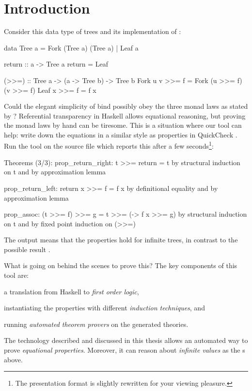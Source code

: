 
\chapter{Introduction}


Consider this data type of trees \citep{grafting} and its implementation
of  \citep{mtl}:

\begin{code}
data Tree a = Fork (Tree a) (Tree a) | Leaf a

return :: a -> Tree a
return = Leaf

(>>=) :: Tree a -> (a -> Tree b) -> Tree b
Fork u v >>= f = Fork (u >>= f) (v >>= f)
Leaf x   >>= f = f x
\end{code}

\noindent
Could the elegant simplicity of bind possibly obey the three monad
laws as stated by \cite{essenceoffp}? Referential transparency in
Haskell allows equational reasoning, but proving the monad laws by
hand can be tiresome. This is a situation where our tool can help:
write down the equations in a similar style as properties in
QuickCheck \citep{quickcheck}. Run the tool on the source file which
reports this after a few seconds\footnote{The presentation format is
  slightly rewritten for your viewing pleasure.}:


\begin{code}
Theorems (3/3):
  prop_return_right: t >>= return = t
    by structural induction on t and by approximation lemma

  prop_return_left: return x >>= f = f x
    by definitional equality and by approximation lemma

  prop_assoc: (t >>= f) >>= g = t >>= (\x -> f x >>= g)
    by structural induction on t and by fixed point induction on (>>=)
\end{code}

\noindent
The output  means that the properties hold for infinite
trees, in contrast to the possible result .

What is going on behind the scenes to prove this? The key components
of this tool are:

\begin{enumerate}
{\setlength\itemindent{18pt} \item a translation from Haskell to \emph{first order logic},}
{\setlength\itemindent{18pt} \item instantiating the properties with different \emph{induction techniques}, and}
{\setlength\itemindent{18pt} \item running \emph{automated theorem provers} on the generated theories.}
\end{enumerate}
The technology described and discussed in this thesis allows an
automated way to prove \emph{equational properties}. Moreover, it can
reason about \emph{infinite values} as the s above.

